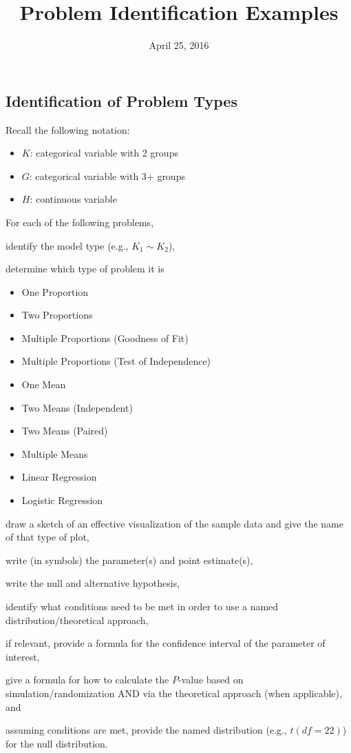 \documentclass[]{article}
\title{Problem Identification Examples}
\author{}
\date{April 25, 2016}
\providecommand{\tightlist}{%
  \setlength{\itemsep}{0pt}\setlength{\parskip}{0pt}}
\newenvironment{tight_enumerate}{ \begin{enumerate}[A)] \setlength{\itemsep}{0pt} \setlength{\parskip}{0pt}}{\end{enumerate}}
\begin{document}
\maketitle

\subsection{Identification of Problem
Types}\label{identification-of-problem-types}

Recall the following notation:

\begin{itemize}
\tightlist
\item
  \(K\): categorical variable with 2 groups
\item
  \(G\): categorical variable with 3+ groups
\item
  \(H\): continuous variable
\end{itemize}

For each of the following problems,

\begin{tight_enumerate}
  \item identify the model type (e.g., $K_1 \sim K_2$),
  \item determine which type of problem it is 
  \begin{itemize}
    \item One Proportion
    \item Two Proportions
    \item Multiple Proportions (Goodness of Fit)
    \item Multiple Proportions (Test of Independence)
    \item One Mean
    \item Two Means (Independent)
    \item Two Means (Paired)
    \item Multiple Means
    \item Linear Regression
    \item Logistic Regression
  \end{itemize}
  \item draw a sketch of an effective visualization of the sample data and give the name of that type of plot,
  \item write (in symbols) the parameter(s) and point estimate(s),
  \item write the null and alternative hypothesis,
  \item identify what conditions need to be met in order to use a named distribution/theoretical approach,
  \item if relevant, provide a formula for the confidence interval of the parameter of interest,
  \item give a formula for how to calculate the $P$-value based on simulation/randomization AND via the theoretical approach (when applicable), and 
  \item assuming conditions are met, provide the named distribution (e.g., $t(df = 22)$) for the null distribution.
\end{tight_enumerate}
\end{document}

